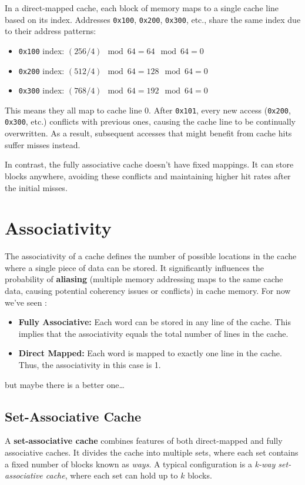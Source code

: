 In a direct-mapped cache, each block of memory maps to a single cache line based on its index. Addresses \texttt{0x100}, \texttt{0x200}, \texttt{0x300}, etc., share the same index due to their address patterns:

\begin{itemize}
    \item \texttt{0x100} index: $(256 / 4) \mod 64 = 64 \mod 64 = 0$
    \item \texttt{0x200} index: $(512 / 4) \mod 64 = 128 \mod 64 = 0$
    \item \texttt{0x300} index: $(768 / 4) \mod 64 = 192 \mod 64 = 0$
\end{itemize}

This means they all map to cache line 0. After \texttt{0x101}, every new access (\texttt{0x200}, \texttt{0x300}, etc.) conflicts with previous ones, causing the cache line to be continually overwritten. As a result, subsequent accesses that might benefit from cache hits suffer misses instead.

In contrast, the fully associative cache doesn't have fixed mappings. It can store blocks anywhere, avoiding these conflicts and maintaining higher hit rates after the initial misses.

\section{Associativity}
The associativity of a cache defines the number of possible locations in the cache where a single piece of data can be stored. It significantly influences the probability of \textbf{aliasing} (multiple memory addressing maps to the same cache data, causing potential coherency issues or conflicts) in cache memory. For now we've seen :

\begin{itemize}
    \item \textbf{Fully Associative:} Each word can be stored in any line of the cache. This implies that the associativity equals the total number of lines in the cache.
    \item \textbf{Direct Mapped:} Each word is mapped to exactly one line in the cache. Thus, the associativity in this case is 1.
\end{itemize}
but maybe there is a better one\dots

\newpage
\subsection{Set-Associative Cache}
A \textbf{set-associative cache} combines features of both direct-mapped and fully associative caches. It divides the cache into multiple sets, where each set contains a fixed number of blocks known as \textit{ways}. A typical configuration is a \textit{k-way set-associative cache}, where each set can hold up to $k$ blocks.

